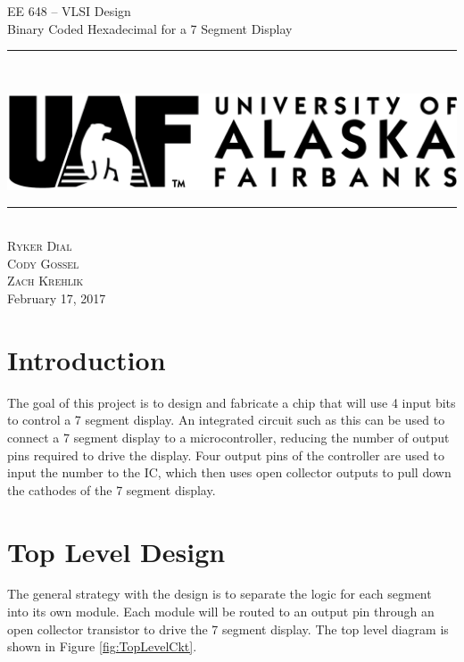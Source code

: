 \documentclass[12pt]{article}
\newcommand{\boldrule}{\rule{\linewidth}{2pt}} %
\begin{document}
\thispagestyle{empty}
\newpage
\vspace*{3cm}
\begin{center}
{\Huge EE 648 -- VLSI Design\\[.5cm]
Binary Coded Hexadecimal for a 7 Segment Display}
\end{center}
\vspace{5mm}
\boldrule\\
\begin{center}
\includegraphics{uaflogo.png}\\[.5cm]
\boldrule\\[3cm]
{\Large
\textsc{Ryker Dial}\\
\textsc{Cody Gossel}\\
\textsc{Zach Krehlik}\\[1cm]
February 17, 2017
}
\end{center}


\newpage

\thispagestyle{empty}
\tableofcontents

\newpage

\setcounter{page}{1}


\section{Introduction}
The goal of this project is to design and fabricate a chip that will use 4 input bits to control a 7 segment display. 
An integrated circuit such as this can be used to connect a 7 segment display to a microcontroller, reducing the number of output pins required to drive the display.
Four output pins of the controller are used to input the number to the IC, which then uses open collector outputs to pull down the cathodes of the 7 segment display. 


\section{Top Level Design}
The general strategy with the design is to separate the logic for each segment into its own module. 
Each module will be routed to an output pin through an open collector transistor to drive the 7 segment display. 
The top level diagram is shown in Figure \ref{fig:TopLevelCkt}.
\end{document}
